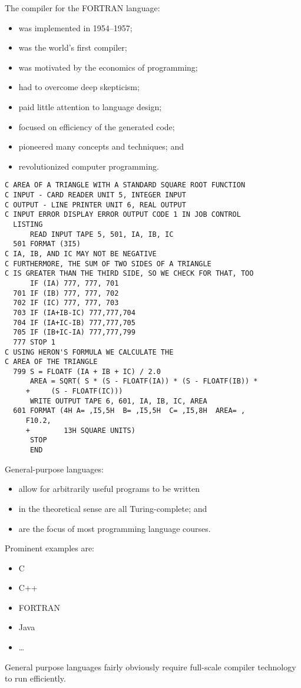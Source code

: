 \begin{slide*}
The compiler for the FORTRAN language:
\begin{itemize}
\item was implemented in 1954--1957;
\item was the world's first compiler;
\item was motivated by the economics of programming;
\item had to overcome deep skepticism;
\item paid little attention to language design;
\item focused on efficiency of the generated code;
\item pioneered many concepts and techniques; and
\item revolutionized computer programming.
\end{itemize}
\vfil
\end{slide*}

\begin{slide*}
{\scriptsize
\begin{verbatim}
C AREA OF A TRIANGLE WITH A STANDARD SQUARE ROOT FUNCTION 
C INPUT - CARD READER UNIT 5, INTEGER INPUT
C OUTPUT - LINE PRINTER UNIT 6, REAL OUTPUT
C INPUT ERROR DISPLAY ERROR OUTPUT CODE 1 IN JOB CONTROL
  LISTING
      READ INPUT TAPE 5, 501, IA, IB, IC
  501 FORMAT (3I5)
C IA, IB, AND IC MAY NOT BE NEGATIVE
C FURTHERMORE, THE SUM OF TWO SIDES OF A TRIANGLE
C IS GREATER THAN THE THIRD SIDE, SO WE CHECK FOR THAT, TOO
      IF (IA) 777, 777, 701
  701 IF (IB) 777, 777, 702
  702 IF (IC) 777, 777, 703
  703 IF (IA+IB-IC) 777,777,704
  704 IF (IA+IC-IB) 777,777,705
  705 IF (IB+IC-IA) 777,777,799
  777 STOP 1
C USING HERON'S FORMULA WE CALCULATE THE
C AREA OF THE TRIANGLE
  799 S = FLOATF (IA + IB + IC) / 2.0
      AREA = SQRT( S * (S - FLOATF(IA)) * (S - FLOATF(IB)) *
     +     (S - FLOATF(IC)))
      WRITE OUTPUT TAPE 6, 601, IA, IB, IC, AREA
  601 FORMAT (4H A= ,I5,5H  B= ,I5,5H  C= ,I5,8H  AREA= ,
     F10.2, 
     +        13H SQUARE UNITS)
      STOP
      END 
\end{verbatim}
} 
\end{slide*}

\begin{slide*}
General-purpose languages:
\begin{itemize}
\item allow for arbitrarily useful programs to be written
\item in the theoretical sense are all Turing-complete; and
\item are the focus of most programming language courses.
\end{itemize}
Prominent examples are:
\begin{itemize}
\item C
\item C++
\item FORTRAN
\item Java
\item \ldots
\end{itemize}
General purpose languages fairly obviously require full-scale compiler
technology to run efficiently.
\vfil
\end{slide*}
 
